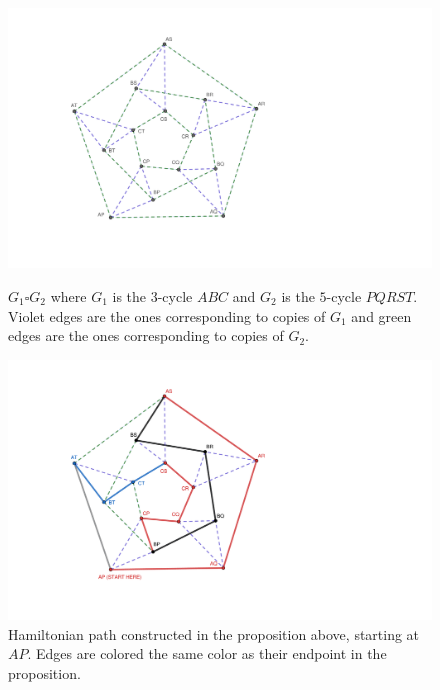 \documentclass{amsart}
\theoremstyle{plain}
\theoremstyle{definition}
\begin{document}
    \begin{figure}[!tbp]
        \centering
        \begin{minipage}[t]{0.49\textwidth}
            \includegraphics[width=\textwidth, trim={6.5cm 5cm 18.5cm 3cm},clip]{media/product}
            \caption{$G_1 \square G_2$ where $G_1$ is the $3$-cycle $ABC$ and $G_2$ is the $5$-cycle
            $PQRST$. \color[HTML]{6557D2} Violet \color{black} edges are the ones corresponding
            to copies of $G_1$ and \color[HTML]{2E7D32} green \color{black} edges are the ones corresponding to copies of $G_2$.}
        \end{minipage}
        \hfill
        \begin{minipage}[t]{0.49\textwidth}
            \includegraphics[width=\textwidth, trim={6.5cm 4.5cm 18.5cm 3cm},clip]{media/path}
            \caption{Hamiltonian path constructed in the proposition above, starting at $AP$. Edges are colored the same color as their endpoint in the proposition.}
        \end{minipage}

    \label{fig:figure}
    \end{figure}
\end{document}
